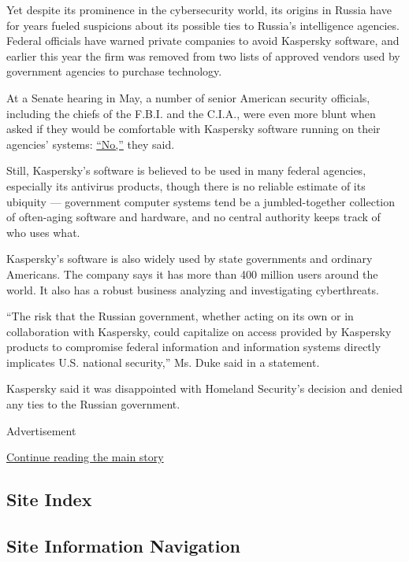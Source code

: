 Yet despite its prominence in the cybersecurity world, its origins in
Russia have for years fueled suspicions about its possible ties to
Russia's intelligence agencies. Federal officials have warned private
companies to avoid Kaspersky software, and earlier this year the firm
was removed from two lists of approved vendors used by government
agencies to purchase technology.

At a Senate hearing in May, a number of senior American security
officials, including the chiefs of the F.B.I. and the C.I.A., were even
more blunt when asked if they would be comfortable with Kaspersky
software running on their agencies' systems:
\href{https://www.youtube.com/watch?v=TJdEq8YqzIg}{``No,''} they said.

Still, Kaspersky's software is believed to be used in many federal
agencies, especially its antivirus products, though there is no reliable
estimate of its ubiquity --- government computer systems tend be a
jumbled-together collection of often-aging software and hardware, and no
central authority keeps track of who uses what.

Kaspersky's software is also widely used by state governments and
ordinary Americans. The company says it has more than 400 million users
around the world. It also has a robust business analyzing and
investigating cyberthreats.

``The risk that the Russian government, whether acting on its own or in
collaboration with Kaspersky, could capitalize on access provided by
Kaspersky products to compromise federal information and information
systems directly implicates U.S. national security,'' Ms. Duke said in a
statement.

Kaspersky said it was disappointed with Homeland Security's decision and
denied any ties to the Russian government.

Advertisement

\protect\hyperlink{after-bottom}{Continue reading the main story}

\hypertarget{site-index}{%
\subsection{Site Index}\label{site-index}}

\hypertarget{site-information-navigation}{%
\subsection{Site Information
Navigation}\label{site-information-navigation}}

